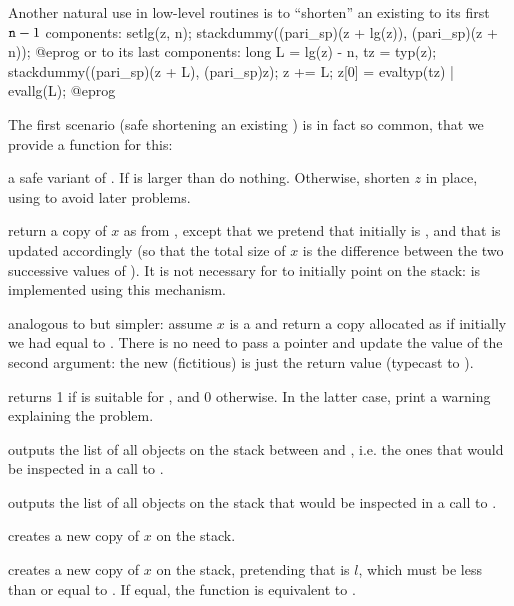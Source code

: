 Another natural use in low-level routines is to ``shorten'' an existing
  to its first ${\tt n}-1$ components:
\bprog
  setlg(z, n);
  stackdummy((pari_sp)(z + lg(z)), (pari_sp)(z + n));
@eprog\noindent
or to its last  components:
\bprog
  long L = lg(z) - n, tz = typ(z);
  stackdummy((pari_sp)(z + L), (pari_sp)z);
  z += L; z[0] = evaltyp(tz) | evallg(L);
@eprog

The first scenario (safe shortening an existing ) is in fact so
common, that we provide a function for this:

 a safe variant of . If
 is larger than  do nothing. Otherwise, shorten $z$ in
place, using  to avoid later  problems.

 return a copy of $x$ as from
, except that we pretend that initially  is ,
and that  is updated accordingly (so that the total size of $x$ is
the difference between the two successive values of ). It is not
necessary for  to initially point on the stack:  is
implemented using this mechanism.

 analogous to  but
simpler: assume $x$ is a  and return a copy allocated as if
initially we had  equal to . There is no need to pass a
pointer and update the value of the second argument: the new (fictitious)
 is just the return value (typecast to ).


 returns 1 if  is suitable for
, and 0 otherwise. In the latter case, print a warning
explaining the problem.

 outputs the list of all objects on the
stack between  and , i.e. the ones that would be inspected
in a call to .

 outputs the list of all objects on the
stack that would be inspected in a call to .


 creates a new copy of $x$ on the stack.

 creates a new copy of $x$
on the stack, pretending that  is $l$, which must be less than or
equal to . If equal, the function is equivalent to .

